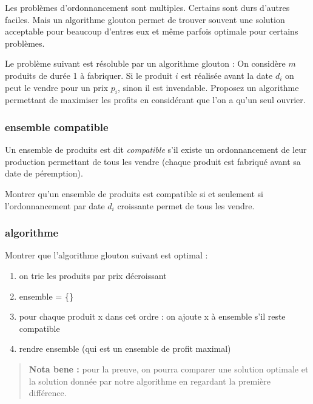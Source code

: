 \documentclass[
]{article}
\providecommand{\tightlist}{%
  \setlength{\itemsep}{0pt}\setlength{\parskip}{0pt}}
\begin{document}
Les problèmes d'ordonnancement sont multiples. Certains sont durs
d'autres faciles. Mais un algorithme glouton permet de trouver souvent
une solution acceptable pour beaucoup d'entres eux et même parfois
optimale pour certains problèmes.

Le problème suivant est résoluble par un algorithme glouton : On
considère \(m\) produits de durée 1 à fabriquer. Si le produit \(i\) est
réalisée avant la date \(d_i\) on peut le vendre pour un prix \(p_i\),
sinon il est invendable. Proposez un algorithme permettant de maximiser
les profits en considérant que l'on a qu'un seul ouvrier.

\hypertarget{ensemble-compatible}{%
\subsubsection{ensemble compatible}\label{ensemble-compatible}}

Un ensemble de produits est dit \emph{compatible} s'il existe un
ordonnancement de leur production permettant de tous les vendre (chaque
produit est fabriqué avant sa date de péremption).

Montrer qu'un ensemble de produits est compatible si et seulement si
l'ordonnancement par date \(d_i\) croissante permet de tous les vendre.

\hypertarget{algorithme}{%
\subsubsection{algorithme}\label{algorithme}}

Montrer que l'algorithme glouton suivant est optimal :

\begin{enumerate}
\def\labelenumi{\arabic{enumi}.}
\tightlist
\item
  on trie les produits par prix décroissant
\item
  ensemble = \{\}
\item
  pour chaque produit x dans cet ordre : on ajoute x à ensemble s'il
  reste compatible
\item
  rendre ensemble (qui est un ensemble de profit maximal)
\end{enumerate}

\begin{quote}
\textbf{Nota bene :} pour la preuve, on pourra comparer une solution
optimale et la solution donnée par notre algorithme en regardant la
première différence.
\end{quote}
\end{document}
